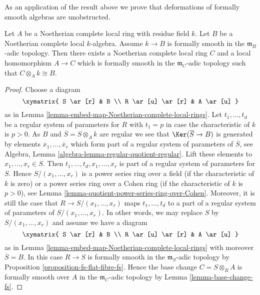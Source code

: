 \noindent
As an application of the result above we prove that deformations
of formally smooth algebras are unobstructed.

\begin{lemma}
\label{lemma-lift-fs}
Let $A$ be a Noetherian complete local ring with residue field $k$.
Let $B$ be a Noetherian complete local $k$-algebra. Assume $k \to B$
is formally smooth in the $\mathfrak m_B$-adic topology.
Then there exists a Noetherian complete local ring $C$
and a local homomorphism $A \to C$ which is formally smooth
in the $\mathfrak m_C$-adic topology such that $C \otimes_A k \cong B$.
\end{lemma}

\begin{proof}
Choose a diagram
$$
\xymatrix{
S \ar[r] & B \\
R \ar[u] \ar[r] & A \ar[u]
}
$$
as in Lemma \ref{lemma-embed-map-Noetherian-complete-local-rings}.
Let $t_1, \ldots, t_d$ be a regular system of parameters for $R$
with $t_1 = p$ in case the characteristic of $k$ is $p > 0$.
As $B$ and $\overline{S} = S \otimes_A k$
are regular we see that $\Ker(\overline{S} \to B)$ is generated by
elements $\overline{x}_1, \ldots, \overline{x}_r$ which form part of a
regular system of parameters of $\overline{S}$, see
Algebra, Lemma \ref{algebra-lemma-regular-quotient-regular}.
Lift these elements to $x_1, \ldots, x_r \in S$. Then
$t_1, \ldots, t_d, x_1, \ldots, x_r$ is part of a regular system of
parameters for $S$. Hence $S/(x_1, \ldots, x_r)$ is a power
series ring over a field (if the characteristic of $k$ is zero)
or a power series ring over a Cohen ring (if the characteristic of
$k$ is $p > 0$), see
Lemma \ref{lemma-quotient-power-series-ring-over-Cohen}.
Moreover, it is still the case that $R \to S/(x_1, \ldots, x_r)$
maps $t_1, \ldots, t_d$ to a part of a regular system of parameters
of $S/(x_1, \ldots, x_r)$. In other words, we may replace $S$ by
$S/(x_1, \ldots, x_r)$ and assume we have a diagram
$$
\xymatrix{
S \ar[r] & B \\
R \ar[u] \ar[r] & A \ar[u]
}
$$
as in Lemma \ref{lemma-embed-map-Noetherian-complete-local-rings}
with moreover $\overline{S} = B$. In this case $R \to S$ is
formally smooth in the $\mathfrak m_S$-adic topology by
Proposition \ref{proposition-fs-flat-fibre-fs}.
Hence the base change $C = S \otimes_R A$ is formally smooth
over $A$ in the $\mathfrak m_C$-adic topology by
Lemma \ref{lemma-base-change-fs}.
\end{proof}

